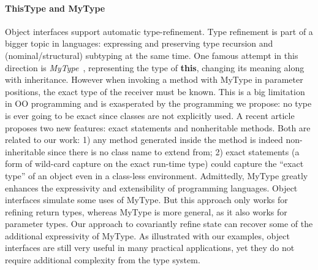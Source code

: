 \paragraph{ThisType and MyType}
Object interfaces support automatic type-refinement.
Type refinement is part of a bigger topic in \classbased languages: expressing and
preserving type recursion and (nominal/structural) subtyping at the same time.
One famous attempt in this direction is 
\emph{MyType}~\cite{bruce1994paradigmatic}, representing the type of
\textbf{this}, changing its meaning along with inheritance. However when
invoking a method with MyType in parameter positions, the exact type of the
receiver must be known. This is a big limitation in \classbased OO
programming and is exasperated by the \interfacebased programming we propose: no
type is ever going to be exact since classes are not explicitly used. A recent
article~\cite{Saito2013933} proposes two
new features: exact statements and nonheritable methods. Both are
related to our work: 1) any method generated inside the \Q@of@ method is indeed
non-inheritable since there is no class name to extend from; 2) exact
statements (a form of wild-card capture on the exact run-time type) could
capture the ``exact type'' of an object even in a class-less
environment.
Admittedly, MyType greatly enhances the expressivity and extensibility of
\objectoriented programming languages. Object interfaces %
simulate some uses of MyType. But this approach only works for refining
return types, whereas MyType is more general, as it also works for
parameter types. Our approach to covariantly refine state can recover
some of the additional expressivity of MyType. As illustrated with our examples, object interfaces are still very useful in many
practical applications, yet they do not require additional
complexity from the type system.



